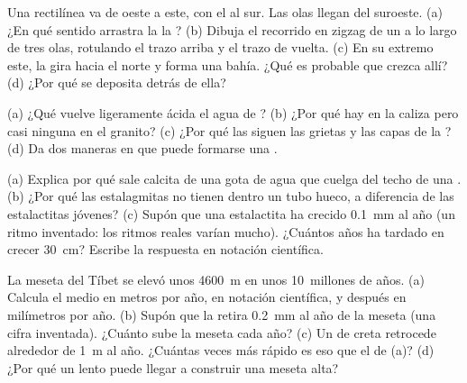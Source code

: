 \begin{exercise}[$\star\star$]\label{exo:g9:landforms:7}
Una  rectilínea va de oeste a este, con el  al sur. Las olas
llegan del suroeste. (a) ¿En qué sentido arrastra la  la ? (b) Dibuja el recorrido en zigzag de un  a lo largo de tres
olas, rotulando el trazo  arriba y el trazo de vuelta. (c) En su
extremo este, la  gira hacia el norte y forma una bahía. ¿Qué  es probable que crezca allí? (d) ¿Por qué se deposita 
detrás de ella?
\end{exercise}

\begin{exercise}[$\star\star$]\label{exo:g9:landforms:8}
(a) ¿Qué vuelve ligeramente ácida el agua de ? (b) ¿Por qué hay
 en la caliza pero casi ninguna en el granito? (c) ¿Por qué las
 siguen las grietas y las capas de la ? (d) Da dos maneras en
que puede formarse una .
\end{exercise}

\begin{exercise}[$\star\star$]\label{exo:g9:landforms:9}
(a) Explica por qué sale calcita de una gota de agua que cuelga del techo
de una . (b) ¿Por qué las estalagmitas no tienen dentro un tubo hueco,
a diferencia de las estalactitas jóvenes? (c) Supón que una estalactita ha
crecido \qty{0.1}{mm} al año (un ritmo inventado: los ritmos reales varían
mucho). ¿Cuántos años ha tardado en crecer \qty{30}{cm}? Escribe la
respuesta en notación científica.
\end{exercise}

\begin{exercise}[$\star\star$]\label{exo:g9:landforms:10}
La meseta del Tíbet se elevó unos \qty{4600}{m} en unos 10~millones de
años. (a) Calcula el  medio en metros por año, en notación
científica, y después en milímetros por año. (b) Supón que la 
retira \qty{0.2}{mm} al año de la meseta (una cifra inventada). ¿Cuánto
sube la meseta cada año? (c) Un  de creta retrocede alrededor de
\qty{1}{m} al año. ¿Cuántas veces más rápido es eso que el 
de (a)? (d) ¿Por qué un  lento puede llegar a construir una
meseta alta?
\end{exercise}

